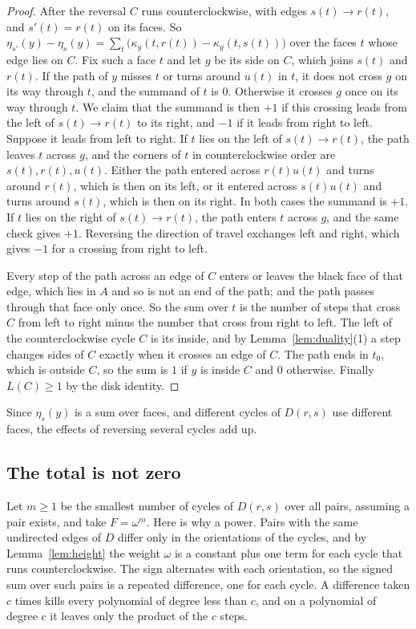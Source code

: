 \documentclass[10pt]{amsart}
\numberwithin{equation}{section}
\theoremstyle{definition}
\theoremstyle{remark}
\begin{document}
\begin{proof}
After the reversal $C$ runs counterclockwise, with edges $s(t)\to r(t)$, and $s'(t)=r(t)$ on its faces.
So $\eta_{s'}(y)-\eta_s(y)=\sum_t\bigl(\kappa_y(t,r(t))-\kappa_y(t,s(t))\bigr)$ over the faces $t$ whose edge lies on $C$.
Fix such a face $t$ and let $g$ be its side on $C$, which joins $s(t)$ and $r(t)$.
If the path of $y$ misses $t$ or turns around $u(t)$ in $t$, it does not cross $g$ on its way through $t$, and the summand of $t$ is $0$.
Otherwise it crosses $g$ once on its way through $t$.
We claim that the summand is then $+1$ if this crossing leads from the left of $s(t)\to r(t)$ to its right, and $-1$ if it leads from right to left.
Suppose it leads from left to right.
If $t$ lies on the left of $s(t)\to r(t)$, the path leaves $t$ across $g$, and the corners of $t$ in counterclockwise order are $s(t),r(t),u(t)$.
Either the path entered across $r(t)u(t)$ and turns around $r(t)$, which is then on its left, or it entered across $s(t)u(t)$ and turns around $s(t)$, which is then on its right.
In both cases the summand is $+1$.
If $t$ lies on the right of $s(t)\to r(t)$, the path enters $t$ across $g$, and the same check gives $+1$.
Reversing the direction of travel exchanges left and right, which gives $-1$ for a crossing from right to left.

Every step of the path across an edge of $C$ enters or leaves the black face of that edge, which lies in $A$ and so is not an end of the path; and the path passes through that face only once.
So the sum over $t$ is the number of steps that cross $C$ from left to right minus the number that cross from right to left.
The left of the counterclockwise cycle $C$ is its inside, and by Lemma~\ref{lem:duality}(1) a step changes sides of $C$ exactly when it crosses an edge of $C$.
The path ends in $t_0$, which is outside $C$, so the sum is $1$ if $y$ is inside $C$ and $0$ otherwise.
Finally $L(C)\ge1$ by the disk identity.
\end{proof}

Since $\eta_s(y)$ is a sum over faces, and different cycles of $D(r,s)$ use different faces, the effects of reversing several cycles add up.

\subsection*{The total is not zero}
Let $m\ge1$ be the smallest number of cycles of $D(r,s)$ over all pairs, assuming a pair exists, and take $F=\omega^m$.
Here is why a power.
Pairs with the same undirected edges of $D$ differ only in the orientations of the cycles, and by Lemma~\ref{lem:height} the weight $\omega$ is a constant plus one term for each cycle that runs counterclockwise.
The sign alternates with each orientation, so the signed sum over such pairs is a repeated difference, one for each cycle.
A difference taken $c$ times kills every polynomial of degree less than $c$, and on a polynomial of degree $c$ it leaves only the product of the $c$ steps.
\end{document}
